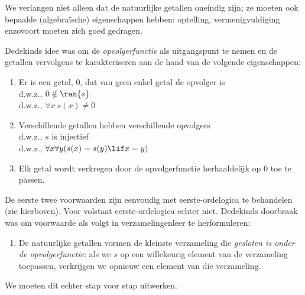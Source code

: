 \documentclass[openany]{memoir}
\begin{document}
\begingroup
\def\olfilename{OLP-0051}
\def\olfilepath{content/sets-functions-relations/infinite/}
\hypertarget{unit-OLP-0051}{}
%



We verlangen niet alleen dat de natuurlijke getallen oneindig zijn;
ze moeten ook bepaalde (algebraïsche) eigenschappen hebben: optelling,
vermenigvuldiging enzovoort moeten zich goed gedragen.

Dedekinds idee was om de \emph{opvolgerfunctie} als uitgangspunt te
nemen en de getallen vervolgens te karakteriseren aan de hand van de
volgende eigenschappen:
\begin{enumerate}
	\item Er is een getal, $0$, dat van geen enkel getal de opvolger is
	\\d.w.z., $0 \notin \ran{s}$
	\\d.w.z., $\forall x\ s(x) \neq 0$
	\item Verschillende getallen hebben verschillende opvolgers
	\\d.w.z., $s$ is injectief
	\\d.w.z., $\forall x \forall y (s(x) = s(y) \lif x = y)$
	\item{} Elk getal wordt verkregen door de
	opvolgerfunctie herhaaldelijk op $0$ toe te passen.
\end{enumerate}
De eerste twee voorwaarden zijn eenvoudig met eerste-ordelogica te
behandelen (zie hierboven). Voor  volstaat
eerste-ordelogica echter niet. Dedekinds doorbraak was om voorwaarde
 als volgt in verzamelingenleer te
herformuleren:
\begin{enumerate}
	\item[3$'$.] De natuurlijke getallen vormen de kleinste verzameling
	die \emph{gesloten is onder de opvolgerfunctie}: als we $s$ op een
	willekeurig element van de verzameling toepassen, verkrijgen we
	opnieuw een element van die verzameling.
\end{enumerate}
We moeten dit echter stap voor stap uitwerken.
\end{document}
